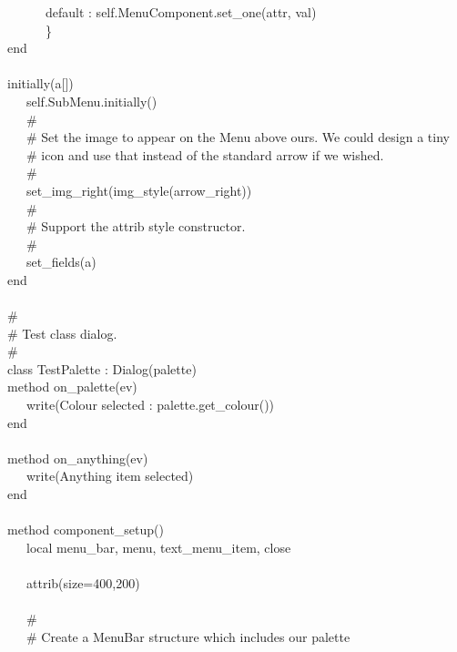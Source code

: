 {\>   \ \ \ \ \ \ default : self.MenuComponent.set\_one(attr, val) \\
\>   \ \ \ \ \ \ \} \\
\>   end \\
\ \\
\>   initially(a[]) \\
\>   \ \ \ self.SubMenu.initially() \\
\>   \ \ \ \# \\
\>   \ \ \ \# Set the image to appear on the Menu above ours. We could design a tiny \\
\>   \ \ \ \# icon and use that instead of the standard arrow if we wished. \\
\>   \ \ \ \#  \\
\>   \ \ \ set\_img\_right(img\_style({\textquotedbl}arrow\_right{\textquotedbl})) \\
\>   \ \ \ \# \\
\>   \ \ \ \# Support the attrib style constructor. \\
\>   \ \ \ \# \\
\>   \ \ \ set\_fields(a) \\
end \\
\ \\
\# \\
\# Test class dialog. \\
\# \\
class TestPalette : Dialog(palette) \\
\>   method on\_palette(ev) \\
\>   \ \ \ write({\textquotedbl}Colour selected : {\textquotedbl}
{\textbar}{\textbar} palette.get\_colour()) \\
\>   end \\
\ \\
\>   method on\_anything(ev) \\
\>   \ \ \ write({\textquotedbl}Anything item selected{\textquotedbl}) \\
\>   end \\
\ \\
\>   method component\_setup() \\
\>   \ \ \ local menu\_bar, menu, text\_menu\_item, close \\
\ \\
\>   \ \ \ attrib({\textquotedbl}size=400,200{\textquotedbl}) \\
\ \\
\>   \ \ \ \# \\
\>   \ \ \ \# Create a MenuBar structure which includes our palette  \\
}
